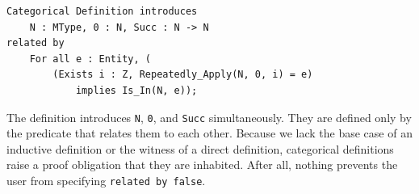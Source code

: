 \begin{lstlisting}
Categorical Definition introduces
	N : MType, 0 : N, Succ : N -> N
related by
	For all e : Entity, (
		(Exists i : Z, Repeatedly_Apply(N, 0, i) = e)
			implies Is_In(N, e));
\end{lstlisting}

The definition introduces \texttt{N}, \texttt{0}, and \texttt{Succ} simultaneously.  They are defined only by the predicate that relates them to each other.  Because we lack the base case of an inductive definition or the witness of a direct definition, categorical definitions raise a proof obligation that they are inhabited.  After all, nothing prevents the user from specifying \texttt{related by false}.
